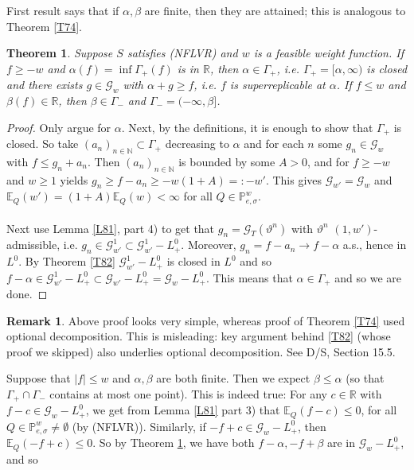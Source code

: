 \documentclass[12pt,a4paper, twoside]{article}
\newtheorem{thm}{Theorem}[section]
\theoremstyle{definition}
\newtheorem{rem}{Remark}[section]
\newcommand{\EE}{\mathbb{E}} %
\newcommand{\PP}{\mathbb{P}} %
\begin{document}
First result says that if $\alpha, \beta$ are finite, then they are attained; this is analogous to Theorem \ref{T74}.
\begin{thm}\label{T91} Suppose $S$ satisfies (NFLVR) and $w$ is a feasible weight function. If $f \geq -w$ and $\alpha(f) = \inf \Gamma_+(f)$ is in $\mathbb{R}$, then $\alpha \in \Gamma_+$, i.e. $\Gamma_+=[ \alpha, \infty)$ is closed and there exists $g \in \mathcal{G}_w$ with $\alpha + g \geq f$, i.e. $f$ is superreplicable at $\alpha$. If $f \leq w$ and $\beta(f) \in \mathbb{R}$, then $\beta \in \Gamma_-$ and $\Gamma_-= (- \infty, \beta]$. 
\end{thm}
\begin{proof}
Only argue for $\alpha$. Next, by the definitions, it is enough to show that $\Gamma_+$ is closed. So take $( a_n)_{n \in \mathbb{N}} \subset \Gamma_+$ decreasing to $\alpha$ and for each $n$ some $g_n \in \mathcal{G}_w$ with $f \leq g_n + a_n$. Then $(a_n)_{n \in \mathbb{N}}$ is bounded by some $A>0$, and for $f \geq -w$ and $w \geq 1$ yields $g_n \geq f- a_n \geq -w(1+A)=:-w'$. This gives $\mathcal{G}_{w'} = \mathcal{G}_w$ and $\EE_Q(w') =(1+A) \EE_Q(w) < \infty$ for all $Q \in \PP_{e, \sigma}^w$. \\
\\
Next use Lemma \ref{L81}, part 4) to get that $g_n = \mathcal{G}_T( \vartheta^n)$ with $\vartheta^n$ $(1,w')$-admissible, i.e. $g_n \in \mathcal{G}_{w'}^1 \subset \mathcal{G}_{w'}^1-L_+^0$. Moreover, $g_n = f-a_n \to f- \alpha$ a.s., hence in $L^0$. By Theorem \ref{T82} $\mathcal{G}_{w'}^1-L_+^0$ is closed in $L^0$ and so $f- \alpha \in \mathcal{G}_{w' }^1-L_+^0 \subset \mathcal{G}_{w'}-L_+^0= \mathcal{G}_w-L_+^0$. This means that $\alpha \in \Gamma_+$ and so we are done. 
\end{proof}
\begin{rem} Above proof looks very simple, whereas proof of Theorem \ref{T74} used optional decomposition. This is misleading: key argument behind \ref{T82} (whose proof we skipped) also underlies optional decomposition. See D/S, Section 15.5.
\end{rem}
Suppose that $|f| \leq w$ and $\alpha, \beta$ are both finite. Then we expect $\beta \leq \alpha$ (so that $\Gamma_+ \cap \Gamma_-$ contains at most one point). This is indeed true: For any $c \in \mathbb{R}$ with $f-c \in \mathcal{G}_w-L_+^0$, we get from Lemma \ref{L81} part 3) that $\EE_Q(f-c) \leq 0$, for all $Q \in \PP_{e, \sigma}^w \neq \emptyset$ (by (NFLVR)). Similarly,  if $-f + c \in \mathcal{G}_w- L_+^0$, then $\EE_Q(-f+c) \leq 0$. So by Theorem \ref{T91}, we have both $f- \alpha, -f+ \beta$ are in $\mathcal{G}_w-L_+^0$, and so 
\end{document}
